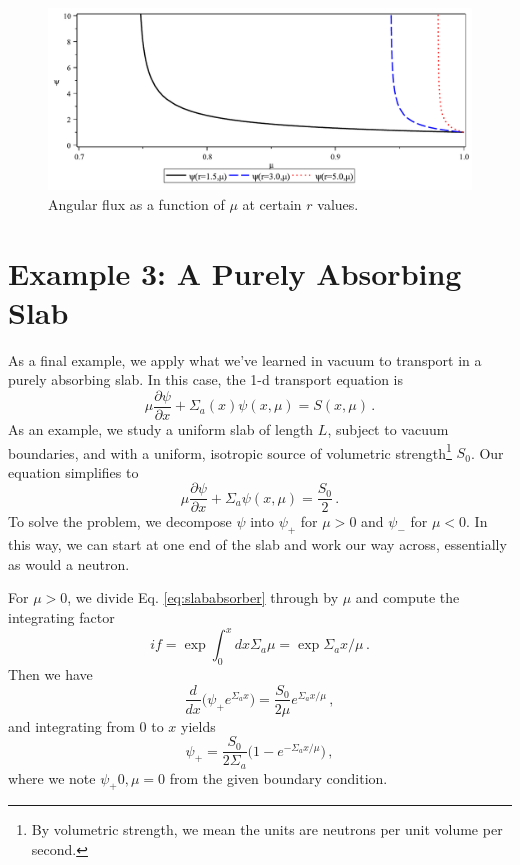 \begin{figure}[ht] 
    \centering
    \includegraphics[keepaspectratio, width = 5.0 in]{images/sphere_psi_mu}
    \caption{Angular flux as a function of $\mu$ at certain $r$ values.}
    \label{fig:sphere_psi_mu}
\end{figure}

\section*{Example 3: A Purely Absorbing Slab}

As a final example, we apply what we've learned in vacuum to transport in a purely absorbing slab.  In this case, the 1-d transport equation is
\begin{equation}
 \mu \frac{\partial \psi}{\partial x} + \Sigma_a(x)\psi(x,\mu) = S(x,\mu) \, .
\end{equation}
As an example, we study a uniform slab of length $L$, subject to vacuum boundaries, and with a uniform, isotropic source of volumetric strength\footnote{By volumetric strength, we mean the units are neutrons per unit volume per second.} $S_0$.  Our equation simplifies to 
\begin{equation}
 \mu \frac{\partial \psi}{\partial x} + \Sigma_a \psi(x,\mu) = \frac{S_0}{2} \, .
 \label{eq:slababsorber}
\end{equation}
To solve the problem, we decompose $\psi$ into $\psi_+$ for $\mu > 0$ and $\psi_-$ for $\mu < 0$.  In this way, we can start at one end of the slab and work our way across, essentially as would a neutron.

For $\mu>0$, we divide Eq. \ref{eq:slababsorber} through by $\mu$ and compute the integrating factor
\begin{equation}
 if = \exp{\int^x_0 dx \Sigma_a\mu} = \exp{\Sigma_a x/\mu} \, .
\end{equation}
Then we have
\begin{equation}
 \frac{d}{dx}\Big ( \psi_{+} e^{\Sigma_a x} \Big ) = \frac{S_0}{2\mu}  e^{\Sigma_a x/\mu} \, ,
\end{equation}
and integrating from $0$ to $x$ yields
\begin{equation}
 \psi_{+} = \frac{S_0}{2\Sigma_a}\Bigg (1 - e^{-\Sigma_a x/\mu} \Bigg ) \, ,
\end{equation}
where we note $\psi_+{0,\mu} = 0$ from the given boundary condition.


